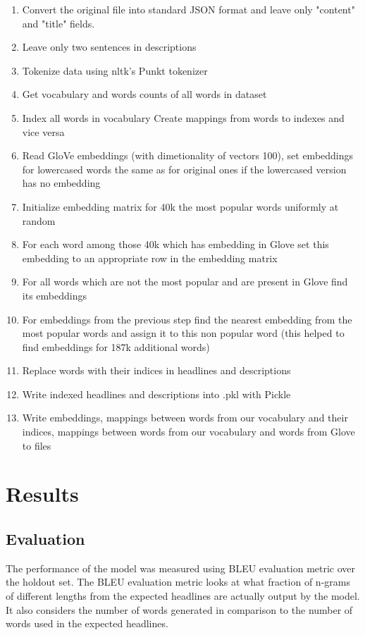 \begin{enumerate}
\setlength\itemsep{-0.5em}
\item Convert the original file into standard JSON format and leave only "content" and "title" fields.
\item Leave only two sentences in descriptions
\item Tokenize data using nltk’s Punkt tokenizer
\item Get vocabulary and words counts of all words in dataset
\item Index all words in vocabulary Create mappings from words to indexes and vice versa
\item Read GloVe embeddings (with dimetionality of vectors 100), set embeddings for lowercased words the same as for original ones if the lowercased version has no embedding
\item Initialize embedding matrix for 40k the most popular words uniformly at random
\item For each word among those 40k which has embedding in Glove set this embedding to an appropriate row in the embedding matrix 
\item For all words which are not the most popular and are present in Glove find its embeddings 
\item For embeddings from the previous step find the nearest embedding from the most popular words and assign it to this non popular word (this helped to find embeddings for 187k additional words)
\item Replace words with their indices in headlines and descriptions
\item Write indexed headlines and descriptions into .pkl with Pickle
\item Write embeddings, mappings between words from our vocabulary and their indices, mappings between words from our vocabulary and words from Glove to files
\end{enumerate}


\section{Results}
\subsection{Evaluation}
The performance of the model was measured using BLEU \cite{bleu} evaluation metric over the holdout set. The BLEU evaluation metric looks at what fraction of n-grams of different lengths from the expected
headlines are actually output by the model. It also considers the number of words generated in comparison to the number of words used in the expected headlines. 


